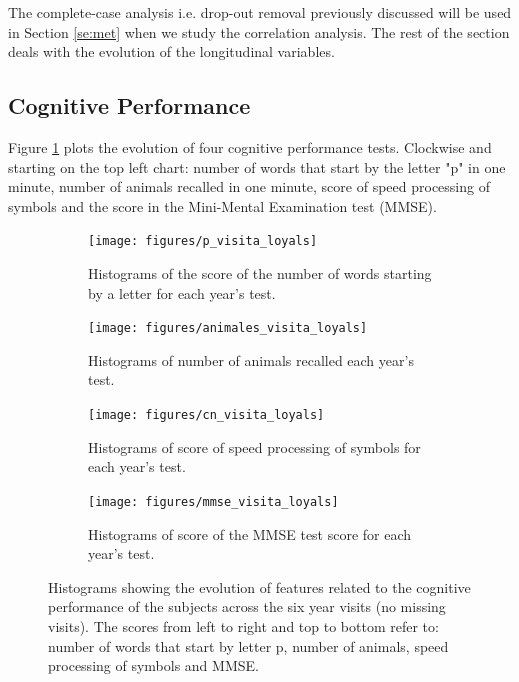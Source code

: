 \documentclass[11pt]{article}
\theoremstyle{definition}
\theoremstyle{remark}
\begin{document}
The complete-case analysis i.e. drop-out removal previously discussed will be used in Section \ref{se:met} when we study the correlation analysis. 
The rest of the section deals with the evolution of the longitudinal variables. 


\subsection{Cognitive Performance}
\label{sse:cogper}

Figure \ref{fig:cogperyears} plots the evolution of four cognitive performance tests. Clockwise and starting on  the top left chart: number of words that start by the letter "p" in one minute, number of animals recalled in one minute, score of speed processing of symbols and the score in the Mini-Mental Examination test (MMSE).

\begin{figure}[!htb]
    \centering
    \begin{subfigure}[t]{0.4\textwidth}
        \centering
        \texttt{[image: figures/p\_visita\_loyals]}
        \caption{Histograms of the score of the number of words starting by a letter for each year's test.}
    \end{subfigure}
    \hfill
    \begin{subfigure}[t]{0.4\textwidth}
        \centering
        \texttt{[image: figures/animales\_visita\_loyals]}
        \caption{Histograms of number of animals recalled each year's test.}
    \end{subfigure}%
    
     \begin{subfigure}[t]{0.4\textwidth}
        \centering
        \texttt{[image: figures/cn\_visita\_loyals]}
        \caption{Histograms of score of speed processing of symbols for each year's test.}
    \end{subfigure}
    \hfill
    \begin{subfigure}[t]{0.4\textwidth}
        \centering
        \texttt{[image: figures/mmse\_visita\_loyals]}
        \caption{Histograms of score of the MMSE test score for each year's test.}
    \end{subfigure}%
    \caption{Histograms showing the evolution of features related to the cognitive performance of the subjects across the six year visits (no missing visits). The scores from left to right and top to bottom refer to: number of words that start by letter p, number of animals, speed processing of symbols and MMSE.}
    \label{fig:cogperyears}
\end{figure}
\end{document}
